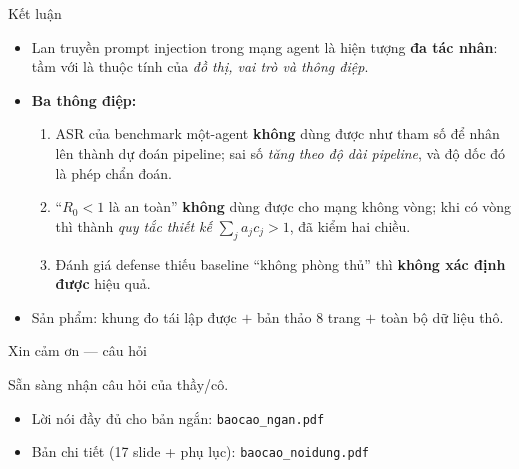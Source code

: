 \documentclass[aspectratio=169,11pt]{beamer}
\begin{document}
\begin{frame}{Kết luận}
  \begin{itemize}
    \item Lan truyền prompt injection trong mạng agent là hiện tượng \textbf{đa tác nhân}:
          tầm với là thuộc tính của \emph{đồ thị, vai trò và thông điệp}.
    \item \textbf{Ba thông điệp:}
      \begin{enumerate}
        \item ASR của benchmark một-agent \textbf{không} dùng được như tham số để nhân lên
              thành dự đoán pipeline; sai số \emph{tăng theo độ dài pipeline}, và độ dốc
              đó là phép chẩn đoán.
        \item ``$R_0<1$ là an toàn'' \textbf{không} dùng được cho mạng không vòng; khi có
              vòng thì thành \emph{quy tắc thiết kế} $\sum_j a_jc_j>1$, đã kiểm hai chiều.
        \item Đánh giá defense thiếu baseline ``không phòng thủ'' thì
              \textbf{không xác định được} hiệu quả.
      \end{enumerate}
    \item Sản phẩm: khung đo tái lập được $+$ bản thảo 8 trang $+$ toàn bộ dữ liệu thô.
  \end{itemize}
\end{frame}

\begin{frame}{Xin cảm ơn --- câu hỏi}
  \begin{center}
    \Large Sẵn sàng nhận câu hỏi của thầy/cô.
  \end{center}
  \vspace{0.8cm}
  \begin{itemize}
    \item Lời nói đầy đủ cho bản ngắn: \texttt{baocao\_ngan.pdf}
    \item Bản chi tiết (17 slide + phụ lục): \texttt{baocao\_noidung.pdf}
  \end{itemize}
\end{frame}
\end{document}
